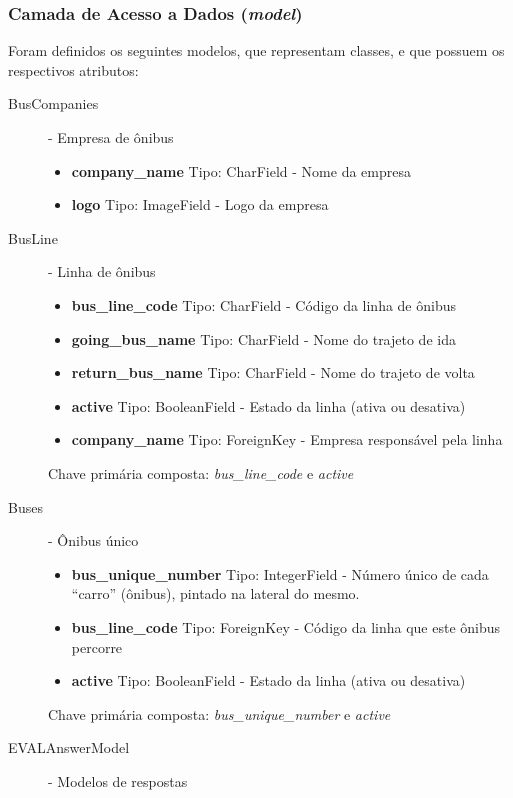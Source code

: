 \subsubsection{Camada de Acesso a Dados (\textit{model})}\label{subsubsec:eval-camada-model}
Foram definidos os seguintes modelos, que representam classes, e que possuem os respectivos atributos:
\begin{description}
    \item[BusCompanies] - Empresa de ônibus
        \begin{itemize}
            \item \textbf{company\_name} Tipo: CharField - Nome da empresa
            \item \textbf{logo} Tipo: ImageField - Logo da empresa
        \end{itemize}
    \item[BusLine] - Linha de ônibus
        \begin{itemize}
            \item \textbf{bus\_line\_code} Tipo: CharField - Código da linha de ônibus
            \item \textbf{going\_bus\_name} Tipo: CharField - Nome do trajeto de ida
            \item \textbf{return\_bus\_name} Tipo: CharField - Nome do trajeto de volta
            \item \textbf{active} Tipo: BooleanField - Estado da linha (ativa ou desativa)
            \item \textbf{company\_name} Tipo: ForeignKey - Empresa responsável pela linha
        \end{itemize}
        Chave primária composta: \textit{bus\_line\_code} e \textit{active}
    \item[Buses] - Ônibus único
        \begin{itemize}
            \item \textbf{bus\_unique\_number} Tipo: IntegerField - Número único de cada ``carro'' (ônibus), pintado na lateral do mesmo.
            \item \textbf{bus\_line\_code} Tipo: ForeignKey - Código da linha que este ônibus percorre
            \item \textbf{active} Tipo: BooleanField - Estado da linha (ativa ou desativa)
        \end{itemize}
        Chave primária composta: \textit{bus\_unique\_number} e \textit{active}
    \item[EVALAnswerModel] - Modelos de respostas
        \begin{itemize}

\end{itemize}
\end{description}
